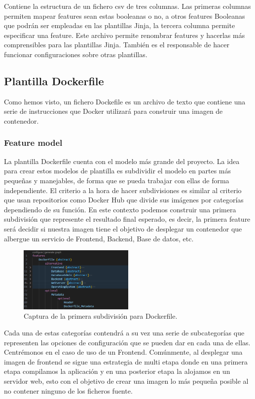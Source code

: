 \documentclass[12pt, a4paper, twoside]{article}
\begin{document}
Contiene la estructura de un fichero csv de tres columnas. Las primeras columnas permiten mapear features sean estas booleanas o no, a otros features Booleanas que podrán ser empleadas en las plantillas Jinja, la tercera columna permite especificar una feature.
Este archivo permite renombrar features y hacerlas más comprensibles para las plantillas Jinja. También es el responsable de hacer funcionar configuraciones sobre otras plantillas.

\newpage
\subsection{Plantilla Dockerfile}
\label{sec:Plantilla Dockerfile}
Como hemos visto, un fichero Dockefile es un archivo de texto que contiene una serie de instrucciones que Docker \cite{docker} utilizará para construir una imagen de contenedor.
\subsubsection{Feature model}

La plantilla Dockerfile cuenta con el modelo más grande del proyecto. La idea para crear estos modelos de plantilla es subdividir el modelo en partes más pequeñas y manejables, de forma que se pueda trabajar con ellas de forma independiente.
El criterio a la hora de hacer subdivisiones es similar al criterio que usan repositorios como Docker Hub \cite{docker_hub} que divide sus imágenes por categorías dependiendo de su función.
En este contexto podemos construir una primera subdivisión que represente el resultado final esperado, es decir, la primera feature será decidir si nuestra imagen tiene el objetivo de desplegar un contenedor que albergue un servicio de Frontend, Backend, Base de datos, etc.

\begin{figure}[h]
	\centering
	  \includegraphics[width=0.5\textwidth]{Dockerfile.uvl.png}
	\caption{Captura de la primera subdivisión para Dockerfile.}
\end{figure}

Cada una de estas categorías contendrá a su vez una serie de subcategorías que representen las opciones de configuración que se pueden dar en cada una de ellas.
\\Centrémonos en el caso de uso de un Frontend. Comúnmente, al desplegar una imagen de frontend se sigue una estrategia de multi etapa \cite{docker_multistage} donde en una primera etapa compilamos la aplicación 
y en una posterior etapa la alojamos en un servidor web, esto con el objetivo de crear una imagen lo más pequeña posible al no contener ninguno de los ficheros fuente.
\end{document}
